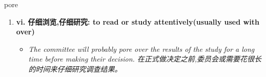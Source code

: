 
\begin{frame}
{\huge pore}
\begin{center}
\begin{enumerate}\Large
  \item \textbf{vi. 仔细浏览,仔细研究: to read or study attentively(usually used with over)}
  \begin{itemize}
    \item \em{\Large{The committee will probably pore over the results of the study for a long time before making their decision. 在正式做决定之前,委员会或需要花很长的时间来仔细研究调查结果。}}
  \end{itemize}
\end{enumerate}
\end{center}
\end{frame}
